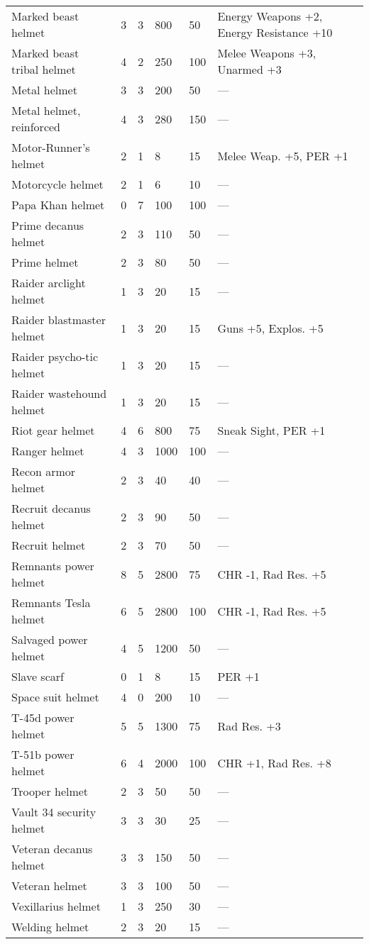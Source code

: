 \begin{longtable}{|p{4cm}|p{1.2cm}|p{1.2cm}|p{1.2cm}|p{1.2cm}|p{4cm}|}
Marked beast helmet  & 3 & 3 & 800 & 50 & Energy Weapons +2, Energy Resistance +10  \\
Marked beast tribal helmet  & 4 & 2 & 250 & 100 & Melee Weapons +3, Unarmed +3  \\
Metal helmet  & 3 & 3 & 200 & 50 & —  \\
Metal helmet, reinforced  & 4 & 3 & 280 & 150 & —  \\
Motor-Runner's helmet  & 2 & 1 & 8 & 15 & Melee Weap. +5, PER +1  \\
Motorcycle helmet  & 2 & 1 & 6 & 10 & —  \\
Papa Khan helmet  & 0 & 7 & 100 & 100 & —  \\
Prime decanus helmet  & 2 & 3 & 110 & 50 & —  \\
Prime helmet  & 2 & 3 & 80 & 50 & —  \\
Raider arclight helmet  & 1 & 3 & 20 & 15 & —  \\
Raider blastmaster helmet  & 1 & 3 & 20 & 15 & Guns +5, Explos. +5  \\
Raider psycho-tic helmet  & 1 & 3 & 20 & 15 & —  \\
Raider wastehound helmet  & 1 & 3 & 20 & 15 & —  \\
Riot gear helmet  & 4 & 6 & 800 & 75 & Sneak Sight, PER +1  \\
Ranger helmet  & 4 & 3 & 1000 & 100 & —  \\
Recon armor helmet  & 2 & 3 & 40 & 40 & —  \\
Recruit decanus helmet  & 2 & 3 & 90 & 50 & —  \\
Recruit helmet  & 2 & 3 & 70 & 50 & —  \\
Remnants power helmet  & 8 & 5 & 2800 & 75 & CHR -1, Rad Res. +5  \\
Remnants Tesla helmet  & 6 & 5 & 2800 & 100 & CHR -1, Rad Res. +5  \\
Salvaged power helmet  & 4 & 5 & 1200 & 50 & —  \\
Slave scarf  & 0 & 1 & 8 & 15 & PER +1  \\
Space suit helmet  & 4 & 0 & 200 & 10 & —  \\
T-45d power helmet  & 5 & 5 & 1300 & 75 & Rad Res. +3  \\
T-51b power helmet  & 6 & 4 & 2000 & 100 & CHR +1, Rad Res. +8  \\
Trooper helmet  & 2 & 3 & 50 & 50 & —  \\
Vault 34 security helmet  & 3 & 3 & 30 & 25 & —  \\
Veteran decanus helmet  & 3 & 3 & 150 & 50 & —  \\
Veteran helmet  & 3 & 3 & 100 & 50 & —  \\
Vexillarius helmet  & 1 & 3 & 250 & 30 & —  \\
Welding helmet  & 2 & 3 & 20 & 15 & —    \\
\hline
\end{longtable}
